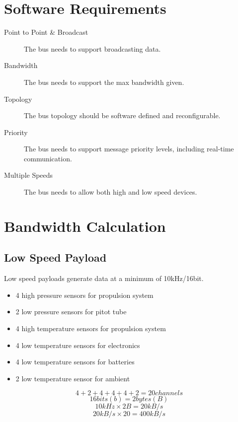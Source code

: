 \documentclass[12pt,article]{memoir}
\begin{document}
\section{Software Requirements}
\begin{description}
	\item[Point to Point \& Broadcast]The bus needs to support broadcasting data.
	\item[Bandwidth]The bus needs to support the max bandwidth given.
	\item[Topology]The bus topology should be software defined and reconfigurable.
	\item[Priority]The bus needs to support message priority levels, including real-time communication.
	\item[Multiple Speeds]The bus needs to allow both high and low speed devices.
\end{description}

\section{Bandwidth Calculation}
\subsection{Low Speed Payload}
Low speed payloads generate data at a minimum of 10kHz/16bit.
\begin{itemize}
\item 4 high pressure sensors for propulsion system
\item 2 low pressure sensors for pitot tube
\item 4 high temperature sensors for propulsion system
\item 4 low temperature sensors for electronics
\item 4 low temperature sensors for batteries
\item 2 low temperature sensor for ambient
\end{itemize}
\begin{equation}
	4+2+4+4+4+2=20 channels
\end{equation}
\begin{equation}
	16 bits (b) = 2 bytes (B)
\end{equation}
\begin{equation}
	10kHz \times 2B =20kB/s
\end{equation}
\begin{equation}
	20kB/s \times 20 = 400kB/s
\end{equation}
\end{document}
